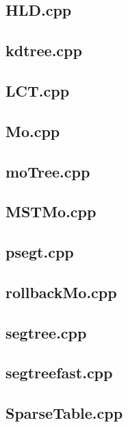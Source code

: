 \subsection{HLD.cpp}


\subsection{kdtree.cpp}


\subsection{LCT.cpp}


\subsection{Mo.cpp}


\subsection{moTree.cpp}


\subsection{MSTMo.cpp}


\subsection{psegt.cpp}


\subsection{rollbackMo.cpp}


\subsection{segtree.cpp}


\subsection{segtreefast.cpp}


\subsection{SparseTable.cpp}


